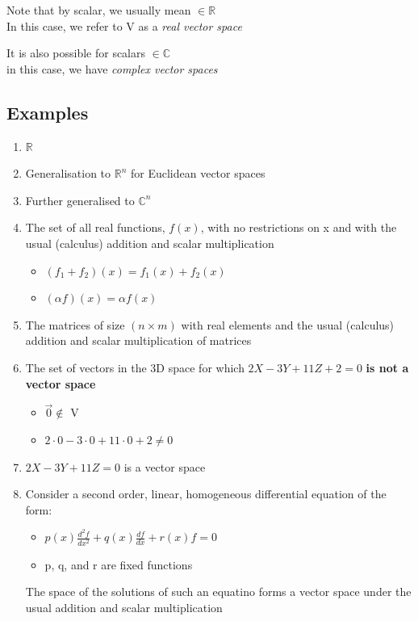\documentclass[a4paper, 11pt, normalem]{report}
\newcommand\R{\mathbb{R}}
\begin{document}
Note that by scalar, we usually mean $\in \R$ \\
In this case, we refer to V as a \emph{real vector space}

It is also possible for scalars $\in \mathbb{C}$ \\
in this case, we have \emph{complex vector spaces}

\subsection{Examples}
\begin{enumerate}
    \item $\R$
    \item Generalisation to $\R^n$ for Euclidean vector spaces
    \item Further generalised to $\mathbb{C}^n$
    \item The set of all real functions, $f(x)$, with no restrictions on x and with the usual (calculus) addition and scalar multiplication
        \begin{itemize}
            \item $(f_1 + f_2 )(x) = f_{1}(x) + f_{2}(x)$
            \item $(\alpha f)(x) = \alpha f(x)$
        \end{itemize}
    \item The matrices of size $(n \times m)$ with real elements and the usual (calculus) addition and scalar multiplication of matrices
    \item The set of vectors in the 3D space for which $2X - 3Y + 11Z + 2 = 0$ \textbf{is not a vector space}
        \begin{itemize}
            \item $\vec{0} \notin$ V
            \item $2\cdot0 - 3\cdot0 + 11\cdot0 + 2 \neq 0$
        \end{itemize}
    \item $2X - 3Y + 11Z = 0$ is a vector space
    \item Consider a second order, linear, homogeneous differential equation of the form:
        \begin{itemize}
            \item $p(x)\frac{d^{2}f}{dx^2} + q(x)\frac{df}{dx} + r(x)f = 0$
            \item p, q, and r are fixed functions
        \end{itemize}
        The space of the solutions of such an equatino forms a vector space under the usual addition and scalar multiplication
\end{enumerate}
\end{document}
